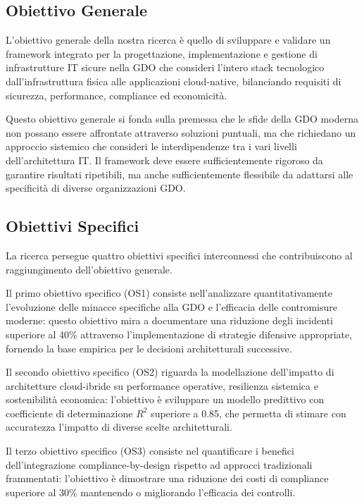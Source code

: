 \subsection{Obiettivo Generale}

L'obiettivo generale della nostra ricerca è quello di sviluppare e validare un framework integrato per la progettazione, implementazione e gestione di infrastrutture IT sicure nella GDO che consideri l'intero stack tecnologico dall'infrastruttura fisica alle applicazioni cloud-native, bilanciando requisiti di sicurezza, performance, compliance ed economicità.

Questo obiettivo generale si fonda sulla premessa che le sfide della GDO moderna non possano essere affrontate attraverso soluzioni puntuali, ma che richiedano un approccio sistemico che consideri le interdipendenze tra i vari livelli dell'architettura IT. Il framework deve essere sufficientemente rigoroso da garantire risultati ripetibili, ma anche sufficientemente flessibile da adattarsi alle specificità di diverse organizzazioni GDO.

\subsection{Obiettivi Specifici}

La ricerca persegue quattro obiettivi specifici interconnessi che contribuiscono al raggiungimento dell'obiettivo generale.

Il primo obiettivo specifico (OS1) consiste nell'analizzare quantitativamente l'evoluzione delle minacce specifiche alla GDO e l'efficacia delle contromisure moderne: questo obiettivo mira a documentare una riduzione degli incidenti superiore al 40\% attraverso l'implementazione di strategie difensive appropriate, fornendo la base empirica per le decisioni architetturali successive.

Il secondo obiettivo specifico (OS2) riguarda la modellazione dell'impatto di architetture cloud-ibride su performance operative, resilienza sistemica e sostenibilità economica: l'obiettivo è sviluppare un modello predittivo con coefficiente di determinazione $R^2$ superiore a 0.85, che permetta di stimare con accuratezza l'impatto di diverse scelte architetturali.

Il terzo obiettivo specifico (OS3) consiste nel quantificare i benefici dell'integrazione compliance-by-design rispetto ad approcci tradizionali frammentati: l'obiettivo è dimostrare una riduzione dei costi di compliance superiore al 30\% mantenendo o migliorando l'efficacia dei controlli.


